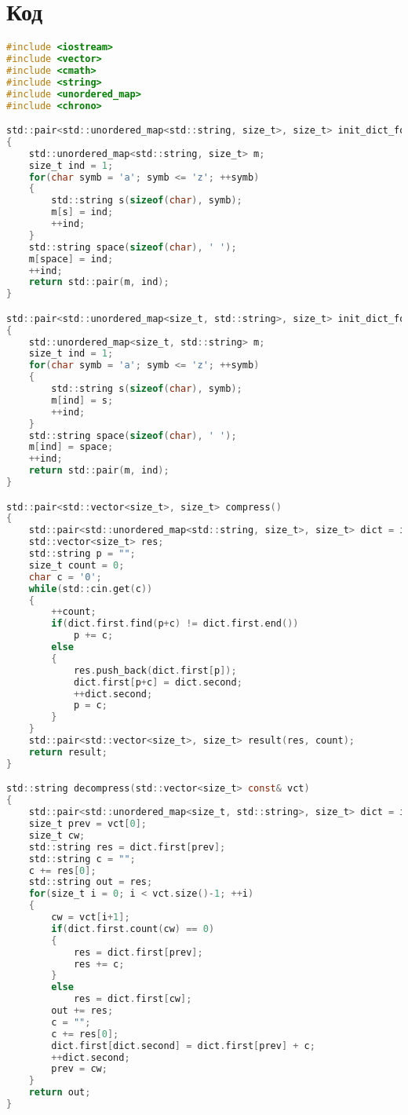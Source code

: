 \section{Код}

\begin{lstlisting}[language=C]
#include <iostream>
#include <vector>
#include <cmath>
#include <string>
#include <unordered_map>
#include <chrono>

std::pair<std::unordered_map<std::string, size_t>, size_t> init_dict_for_compress()
{
    std::unordered_map<std::string, size_t> m;
    size_t ind = 1;
    for(char symb = 'a'; symb <= 'z'; ++symb)
    {
        std::string s(sizeof(char), symb);
        m[s] = ind;
        ++ind;
    }
    std::string space(sizeof(char), ' ');
    m[space] = ind;
    ++ind;
    return std::pair(m, ind);
}

std::pair<std::unordered_map<size_t, std::string>, size_t> init_dict_for_decompress()
{
    std::unordered_map<size_t, std::string> m;
    size_t ind = 1;
    for(char symb = 'a'; symb <= 'z'; ++symb)
    {
        std::string s(sizeof(char), symb);
        m[ind] = s;
        ++ind;
    }
    std::string space(sizeof(char), ' ');
    m[ind] = space;
    ++ind;
    return std::pair(m, ind);
}

std::pair<std::vector<size_t>, size_t> compress()
{
    std::pair<std::unordered_map<std::string, size_t>, size_t> dict = init_dict_for_compress();
    std::vector<size_t> res;
    std::string p = "";
    size_t count = 0;
    char c = '0';
    while(std::cin.get(c))
    {
        ++count;
        if(dict.first.find(p+c) != dict.first.end())
            p += c;
        else
        {
            res.push_back(dict.first[p]);
            dict.first[p+c] = dict.second;
            ++dict.second;
            p = c;
        }
    }
    std::pair<std::vector<size_t>, size_t> result(res, count);
    return result;
}

std::string decompress(std::vector<size_t> const& vct)
{
    std::pair<std::unordered_map<size_t, std::string>, size_t> dict = init_dict_for_decompress();
    size_t prev = vct[0];
    size_t cw;
    std::string res = dict.first[prev];
    std::string c = "";
    c += res[0];
    std::string out = res;
    for(size_t i = 0; i < vct.size()-1; ++i)
    {
        cw = vct[i+1];
        if(dict.first.count(cw) == 0)
        {
            res = dict.first[prev];
            res += c;
        }
        else
            res = dict.first[cw];
        out += res;
        c = "";
        c += res[0];
        dict.first[dict.second] = dict.first[prev] + c;
        ++dict.second;
        prev = cw;
    }
    return out;
}


\end{lstlisting}
